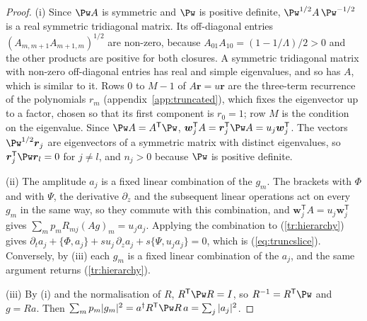 \begin{proof}
(i) Since $\Pw A$ is symmetric and $\Pw$ is positive definite, $\Pw^{1/2}A\,\Pw^{-1/2}$ is a real symmetric tridiagonal matrix. Its off-diagonal entries $(A_{m,m+1}A_{m+1,m})^{1/2}$ are non-zero, because $A_{01}A_{10}=(1-1/\Lambda)/2>0$ and the other products are positive for both closures. A symmetric tridiagonal matrix with non-zero off-diagonal entries has real and simple eigenvalues, and so has $A$, which is similar to it. Rows $0$ to $M-1$ of $A\boldsymbol r=u\boldsymbol r$ are the three-term recurrence of the polynomials $r_m$ (appendix~\ref{app:truncated}), which fixes the eigenvector up to a factor, chosen so that its first component is $r_0=1$; row $M$ is the condition on the eigenvalue. Since $\Pw A=A^{\mathsf T}\Pw$, $\boldsymbol w_j^{\mathsf T}A=\boldsymbol r_j^{\mathsf T}\Pw A=u_j\boldsymbol w_j^{\mathsf T}$. The vectors $\Pw^{1/2}\boldsymbol r_j$ are eigenvectors of a symmetric matrix with distinct eigenvalues, so $\boldsymbol r_j^{\mathsf T}\Pw\boldsymbol r_l=0$ for $j\neq l$, and $n_j>0$ because $\Pw$ is positive definite.

(ii) The amplitude $a_j$ is a fixed linear combination of the $g_m$. The brackets with $\Phi$ and with $\Psi$, the derivative $\partial_z$ and the subsequent linear operations act on every $g_m$ in the same way, so they commute with this combination, and $\boldsymbol w_j^{\mathsf T}A=u_j\boldsymbol w_j^{\mathsf T}$ gives $\sum_mp_mR_{mj}(Ag)_m=u_ja_j$. Applying the combination to (\ref{tr:hierarchy}) gives $\partial_ta_j+\{\Phi,a_j\}+su_j\,\partial_za_j+s\{\Psi,u_ja_j\}=0$, which is (\ref{eq:truncslice}). Conversely, by (iii) each $g_m$ is a fixed linear combination of the $a_j$, and the same argument returns (\ref{tr:hierarchy}).

(iii) By (i) and the normalisation of $R$, $R^{\mathsf T}\Pw R=I$, so $R^{-1}=R^{\mathsf T}\Pw$ and $g=Ra$. Then $\sum_mp_m|g_m|^2=a^\dagger R^{\mathsf T}\Pw R\,a=\sum_j|a_j|^2$.
\end{proof}

